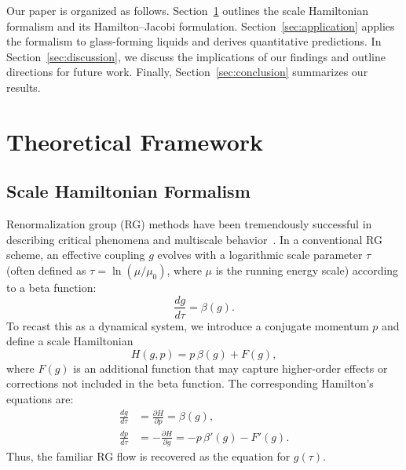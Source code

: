 \documentclass[12pt]{article}
\begin{document}
Our paper is organized as follows. Section~\ref{sec:framework} outlines the scale Hamiltonian formalism and its Hamilton--Jacobi formulation. Section~\ref{sec:application} applies the formalism to glass-forming liquids and derives quantitative predictions. In Section~\ref{sec:discussion}, we discuss the implications of our findings and outline directions for future work. Finally, Section~\ref{sec:conclusion} summarizes our results.

\section{Theoretical Framework} \label{sec:framework}

\subsection{Scale Hamiltonian Formalism}
Renormalization group (RG) methods have been tremendously successful in describing critical phenomena and multiscale behavior~\cite{wilson1974renormalization}. In a conventional RG scheme, an effective coupling \(g\) evolves with a logarithmic scale parameter \(\tau\) (often defined as \(\tau = \ln (\mu/\mu_0)\), where \(\mu\) is the running energy scale) according to a beta function:
\begin{equation} \label{eq:beta}
\frac{dg}{d\tau} = \beta(g).
\end{equation}
To recast this as a dynamical system, we introduce a conjugate momentum \(p\) and define a scale Hamiltonian
\begin{equation} \label{eq:Hamiltonian}
H(g,p) = p\,\beta(g) + F(g),
\end{equation}
where \(F(g)\) is an additional function that may capture higher-order effects or corrections not included in the beta function. The corresponding Hamilton's equations are:
\begin{align}
\frac{dg}{d\tau} &= \frac{\partial H}{\partial p} = \beta(g), \label{eq:ham1} \\
\frac{dp}{d\tau} &= -\frac{\partial H}{\partial g} = -p\,\beta'(g) - F'(g). \label{eq:ham2}
\end{align}
Thus, the familiar RG flow is recovered as the equation for \(g(\tau)\).
\end{document}
